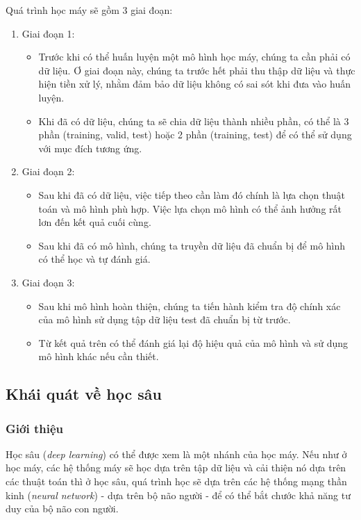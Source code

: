 Quá trình học máy sẽ gồm 3 giai đoạn\cite{webpage2}:
\begin{enumerate}
    \item Giai đoạn 1:
          \begin{itemize}
              \item Trước khi có thể huấn luyện một mô hình học máy, chúng ta cần phải có dữ liệu. Ơ giai đoạn này, chúng ta trước hết phải thu thập dữ liệu và thực hiện tiền xử lý, nhằm đảm bảo dữ liệu không có sai sót khi đưa vào huấn luyện.
              \item Khi đã có dữ liệu, chúng ta sẽ chia dữ liệu thành nhiều phần, có thể là 3 phần (training, valid, test) hoặc 2 phần (training, test) để có thể sử dụng với mục đích tương ứng.
          \end{itemize}
    \item Giai đoạn 2:
          \begin{itemize}
              \item Sau khi đã có dữ liệu, việc tiếp theo cần làm đó chính là lựa chọn thuật toán và mô hình phù hợp. Việc lựa chọn mô hình có thể ảnh hưởng rất lơn đến kết quả cuối cùng.
              \item Sau khi đã có mô hình, chúng ta truyền dữ liệu đã chuẩn bị để mô hình có thể học và tự đánh giá.
          \end{itemize}
    \item Giai đoạn 3:
          \begin{itemize}
              \item Sau khi mô hình hoàn thiện, chúng ta tiến hành kiểm tra độ chính xác của mô hình sử dụng tập dữ liệu test đã chuẩn bị từ trước.
              \item Từ kết quả trên có thể đánh giá lại độ hiệu quả của mô hình và sử dụng mô hình khác nếu cần thiết.
          \end{itemize}
\end{enumerate}

\subsection{Khái quát về học sâu}
\subsubsection{Giới thiệu}
Học sâu (\textit{deep learning}) có thể được xem là một nhánh của học máy. Nếu như ở học máy, các hệ thống máy sẽ học dựa trên tập dữ liệu và cải thiện nó dựa trên các thuật toán thì ở học sâu, quá trình học sẽ dựa trên các hệ thống mạng thần kinh (\textit{neural network}) - dựa trên bộ não người - để có thể bắt chước khả năng tư duy của bộ não con người.\cite{webpage10}

